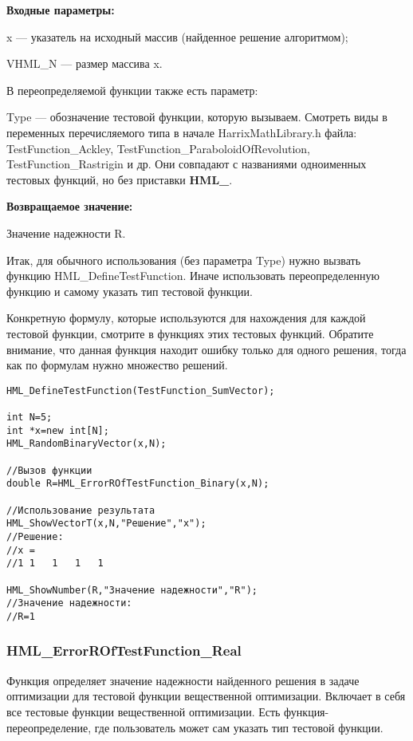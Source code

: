 \documentclass[a4paper,12pt]{article}
\begin{document}
\textbf{Входные параметры:}

x --- указатель на исходный массив (найденное решение алгоритмом);

VHML\_N --- размер массива x.

В переопределяемой функции также есть параметр:
  
Type --- обозначение тестовой функции, которую вызываем.
Смотреть виды в переменных перечисляемого типа в начале HarrixMathLibrary.h файла: TestFunction\_Ackley, TestFunction\_ParaboloidOfRevolution, TestFunction\_Rastrigin и др. Они совпадают с названиями одноименных тестовых функций, но без приставки \textbf{HML\_}.

\textbf{Возвращаемое значение:}
 
Значение надежности R.

Итак, для обычного использования (без параметра Type) нужно вызвать функцию HML\_DefineTestFunction. Иначе использовать переопределенную функцию и самому указать тип тестовой функции.

Конкретную формулу, которые используются для нахождения для каждой тестовой функции, смотрите в функциях этих тестовых функций. Обратите внимание, что данная функция находит ошибку только для одного решения, тогда как по формулам нужно множество решений.


\begin{lstlisting}[label=code_use_HML_ErrorROfTestFunction_Binary,caption=Пример использования]
HML_DefineTestFunction(TestFunction_SumVector);

int N=5;
int *x=new int[N];
HML_RandomBinaryVector(x,N);

//Вызов функции
double R=HML_ErrorROfTestFunction_Binary(x,N);

//Использование результата
HML_ShowVectorT(x,N,"Решение","x");
//Решение:
//x =
//1	1	1	1	1

HML_ShowNumber(R,"Значение надежности","R");
//Значение надежности:
//R=1
\end{lstlisting}

\subsubsection{HML\_ErrorROfTestFunction\_Real}\label{HML_ErrorROfTestFunction_Real}

Функция определяет значение надежности найденного решения в задаче оптимизации для тестовой функции вещественной оптимизации. Включает в себя все тестовые функции  вещественной оптимизации. Есть функция-переопределение, где пользователь может сам указать тип тестовой функции.
\end{document}
